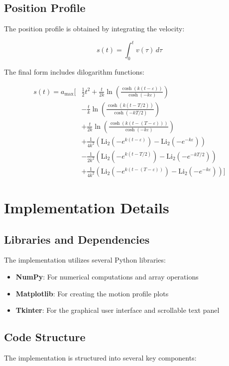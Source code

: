 \documentclass[12pt,a4paper]{article}
\begin{document}
\subsection{Position Profile}
The position profile is obtained by integrating the velocity:

\begin{equation}
s(t) = \int_0^t v(\tau)\,d\tau
\end{equation}

The final form includes dilogarithm functions:

\begin{equation}
\begin{split}
s(t) = a_{\text{max}}\Big[&\frac{1}{2}t^2 + \frac{t}{2k}\ln\left(\frac{\cosh(k(t-\varepsilon))}{\cosh(-k\varepsilon)}\right) \\
&- \frac{t}{k}\ln\left(\frac{\cosh(k(t-T/2))}{\cosh(-kT/2)}\right) \\
&+ \frac{t}{2k}\ln\left(\frac{\cosh(k(t-(T-\varepsilon)))}{\cosh(-k\varepsilon)}\right) \\
&+ \frac{1}{4k^2}(\text{Li}_2(-e^{k(t-\varepsilon)}) - \text{Li}_2(-e^{-k\varepsilon})) \\
&- \frac{1}{2k^2}(\text{Li}_2(-e^{k(t-T/2)}) - \text{Li}_2(-e^{-kT/2})) \\
&+ \frac{1}{4k^2}(\text{Li}_2(-e^{k(t-(T-\varepsilon))}) - \text{Li}_2(-e^{-k\varepsilon}))\Big]
\end{split}
\end{equation}

\section{Implementation Details}

\subsection{Libraries and Dependencies}
The implementation utilizes several Python libraries:
\begin{itemize}
\item \textbf{NumPy}: For numerical computations and array operations
\item \textbf{Matplotlib}: For creating the motion profile plots
\item \textbf{Tkinter}: For the graphical user interface and scrollable text panel
\end{itemize}

\subsection{Code Structure}
The implementation is structured into several key components:
\end{document}
